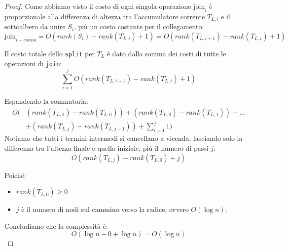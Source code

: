 \begin{proof}
    Come abbiamo visto il costo di ogni singola operazione $\text{join}_i$ è proporzionale alla differenza di altezza tra l'accumulatore corrente $T_{L,i}$ e il sottoalbero da unire $S_i$, più un costo costante per il collegamento:
    \[ \text{join}_{i-esimo} = O(rank(S_i) - rank(T_{L,i}) + 1) = O(rank(T_{L,i+1}) - rank(T_{L,i}) +1)\]
    
    Il costo totale dello \texttt{split} per $T_L$ è dato dalla somma dei costi di tutte le operazioni di \texttt{join}:
    \[ \sum_{i=1}^{j} O(rank(T_{L,i+1}) - rank(T_{L,i}) +1) \]
    
    Espandendo la sommatoria:
    \[
    \begin{aligned}
        O \Big( & (rank(T_{L,1}) - rank(T_{L,0})) + (rank(T_{L,2}) - rank(T_{L,1})) + \dots \\
        & + (rank(T_{L,j}) - rank(T_{L,j-1})) + \sum_{i=1}^{j} 1 \Big)
    \end{aligned}
    \]
    Notiamo che tutti i termini intermedi si cancellano a vicenda, lasciando solo la differenza tra l'altezza finale e quella iniziale, più il numero di passi $j$:
    \[ O(rank(T_{L,j}) - rank(T_{L,0}) + j) \]
    
    Poiché:
    \begin{itemize}
        \item $rank(T_{L,0}) \geq 0$
        \item $j$ è il numero di nodi sul cammino verso la radice, ovvero $O(\log n)$;
    \end{itemize}
    
    Concludiamo che la complessità è:
    \[ O(\log n - 0 + \log n) = O(\log n) \]
\end{proof}
    
    
    
    
    
    